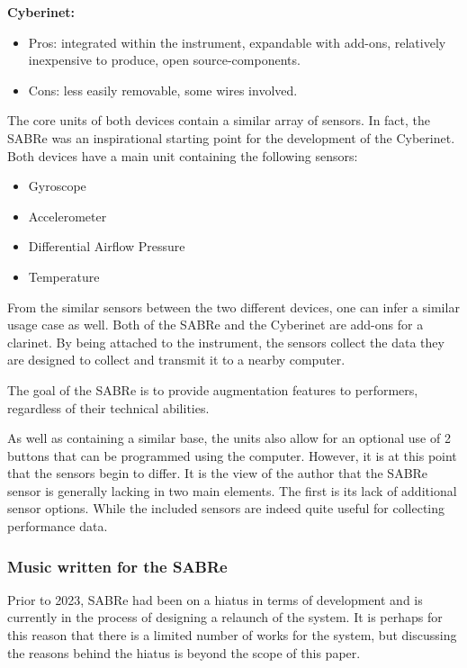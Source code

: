 \textbf{Cyberinet:} 

\begin{itemize}
    \item Pros: integrated within the instrument, expandable with add-ons, relatively inexpensive to produce, open source-components.
    \item Cons: less easily removable, some wires involved.
\end{itemize}

The core units of both devices contain a similar array of sensors. In fact, the SABRe was an inspirational starting point for the development of the Cyberinet. Both devices have a main unit containing the following sensors:

\begin{itemize}
    \item Gyroscope
    \item Accelerometer 
    \item Differential Airflow Pressure
    \item Temperature
\end{itemize}

From the similar sensors between the two different devices, one can infer a similar usage case as well. Both of the SABRe and the Cyberinet are add-ons for a clarinet. By being attached to the instrument, the sensors collect the data they are designed to collect and transmit it to a nearby computer.

The goal of the SABRe is to provide augmentation features to performers, regardless of their technical abilities\cite{Schiesser2012}.

As well as containing a similar base, the units also allow for an optional use of 2 buttons that can be programmed using the computer. However, it is at this point that the sensors begin to differ. It is the view of the author that the SABRe sensor is generally lacking in two main elements. The first is its lack of additional sensor options. While the included sensors are indeed quite useful for collecting performance data.

\subsubsection{Music written for the SABRe}

Prior to 2023, SABRe had been on a hiatus in terms of development and is currently in the process of designing a relaunch of the system. It is perhaps for this reason that there is a limited number of works for the system, but discussing the reasons behind the hiatus is beyond the scope of this paper.

